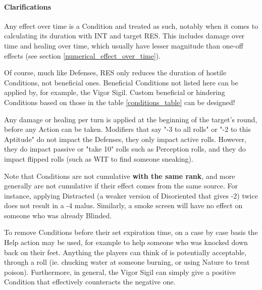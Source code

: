 \paragraph{Clarifications} 

Any effect over time is a Condition and treated as such, notably when it comes to calculating its duration with INT and target RES. This includes damage over time and healing over time, which usually have lesser magnitude than one-off effects (see section \ref{numerical_effect_over_time}).

Of course, much like Defenses, RES only reduces the duration of hostile Conditions, not beneficial ones. Beneficial Conditions not listed here can be applied by, for example, the Vigor Sigil. Custom beneficial or hindering Conditions based on those in the table \ref{conditions_table} can be designed!

Any damage or healing per turn is applied at the beginning of the target's round, before any Action can be taken. Modifiers that say "-3 to all rolls" or "-2 to this Aptitude" do not impact the Defenses, they only impact active rolls. However, they do impact passive or "take 10" rolls such as Perception rolls, and they do impact flipped rolls (such as WIT to find someone sneaking).

Note that Conditions are not cumulative \textbf{with the same rank}, and more generally are not cumulative if their effect comes from the same source. For instance, applying Distracted (a weaker version of Disoriented that gives -2) twice does not result in a -4 malus. Similarly, a smoke screen will have no effect on someone who was already Blinded.

To remove Conditions before their set expiration time, on a case by case basis the Help action may be used, for example to help someone who was knocked down back on their feet. Anything the players can think of is potentially acceptable, through a roll (ie. chucking water at someone burning, or using Nature to treat poison). Furthermore, in general, the Vigor Sigil can simply give a positive Condition that effectively counteracts the negative one.

